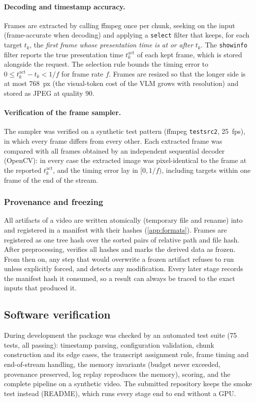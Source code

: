 \paragraph{Decoding and timestamp accuracy.}
Frames are extracted by calling ffmpeg once per chunk, seeking on the input
(frame-accurate when decoding) and applying a \texttt{select} filter that keeps,
for each target $t_k$, the \emph{first frame whose presentation time is at or
after} $t_k$. The \texttt{showinfo} filter reports the true presentation time
$t_k^{\mathrm{act}}$ of each kept frame, which is stored alongside the request.
The selection rule bounds the timing error to $0\le t_k^{\mathrm{act}}-t_k<1/f$
for frame rate $f$. Frames are resized so that the longer side is at most
768~px (the visual-token cost of the VLM grows with resolution) and stored as
JPEG at quality 90.

\paragraph{Verification of the frame sampler.}
The sampler was verified on a synthetic test pattern (ffmpeg
\texttt{testsrc2}, 25~fps), in which every frame differs from every other.
Each extracted frame was compared with all frames obtained by an independent
sequential decoder (OpenCV): in every case the extracted image was
pixel-identical to the frame at the reported $t_k^{\mathrm{act}}$, and the
timing error lay in $[0,1/f)$, including targets within one frame of the end
of the stream.

\subsubsection{Provenance and freezing}\label{sec:provenance}
All artifacts of a video are written atomically (temporary file and rename)
into  and registered in a manifest with their
hashes (\cref{app:formats}). Frames are registered as one tree hash over the
sorted pairs of relative path and file hash. After preprocessing,
 verifies all hashes and marks the derived data as frozen.
From then on, any step that would overwrite a frozen artifact refuses to run
unless explicitly forced, and  detects any modification.
Every later stage records the manifest hash it consumed, so a result can
always be traced to the exact inputs that produced it.


\subsection{Software verification}
During development the package was checked by an automated test suite (75
tests, all passing): timestamp parsing, configuration validation, chunk
construction and its edge cases, the transcript assignment rule, frame timing
and end-of-stream handling, the memory invariants (budget never exceeded,
provenance preserved, log replay reproduces the memory), scoring, and the
complete pipeline on a synthetic video. The submitted repository keeps the
smoke test instead (README), which runs every stage end to end without a GPU.
